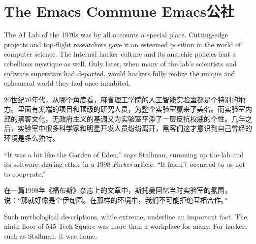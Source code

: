 \chapter{\ifdefined\eng
The Emacs Commune
\fi
\ifdefined\chs
Emacs公社
\fi
}
\thispagestyle{empty}
\ifdefined\eng
The AI Lab of the 1970s was by all accounts a special place. Cutting-edge projects and top-flight researchers gave it an esteemed position in the world of computer science. The internal hacker culture and its anarchic policies lent a rebellious mystique as well. Only later, when many of the lab's scientists and software superstars had departed, would hackers fully realize the unique and ephemeral world they had once inhabited.
\fi

\ifdefined\chs
20世纪70年代，从哪个角度看，麻省理工学院的人工智能实验室都是个特别的地方。里面有尖端的项目和顶级的研究人员，为整个实验室赢来了美名。而实验室内部的黑客文化，无政府主义的基调又为实验室平添了一层反抗权威的个性。几年之后，实验室中很多科学家和明星开发人员纷纷离开，黑客们这才意识到自己曾经的环境是多么独特。
\fi

\ifdefined\eng
``It was a bit like the Garden of Eden,'' says Stallman, summing up the lab and its software-sharing ethos in a 1998 \textit{Forbes} article. ``It hadn't occurred to us not to cooperate.''
\fi

\ifdefined\chs
在一篇1998年《福布斯》杂志上的文章中，斯托曼回忆当时实验室的氛围，说：``那就好像是个伊甸园。在那样的环境中，我们不可能拒绝互相合作。''
\fi

\ifdefined\eng
Such mythological descriptions, while extreme, underline an important fact. The ninth floor of 545 Tech Square was more than a workplace for many. For hackers such as Stallman, it was home.
\fi

